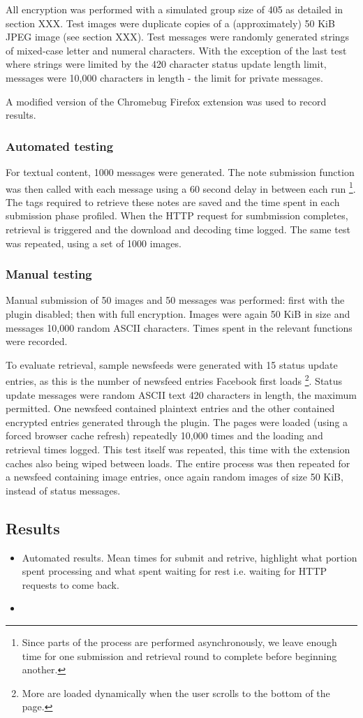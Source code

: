 All encryption was performed with a simulated group size of 405 as detailed in section XXX. Test images were duplicate copies of a (approximately) 50 KiB JPEG image (see section XXX). Test messages were randomly generated strings of mixed-case letter and numeral characters. With the exception of the last test where strings were limited by the 420 character status update length limit, messages were 10,000 characters in length - the limit for private messages. 

A modified version of the Chromebug Firefox extension was used to record results.

\subsubsection{Automated testing}

For textual content, 1000 messages were generated. The note submission function was then called with each message using a 60 second delay in between each run \footnote{Since parts of the process are performed asynchronously, we leave enough time for one submission and retrieval round to complete before beginning another.}. The tags required to retrieve these notes are saved and the time spent in each submission phase profiled. When the HTTP request for sumbmission completes, retrieval is triggered and the download and decoding time logged. The same test was repeated, using a set of 1000 images.

\subsubsection{Manual testing}

Manual submission of 50 images and 50 messages was performed: first with the plugin disabled; then with full encryption. Images were again 50 KiB in size and messages 10,000 random ASCII characters. Times spent in the relevant functions were recorded.

To evaluate retrieval, sample newsfeeds were generated with 15 status update entries, as this is the number of newsfeed entries Facebook first loads \footnote{More are loaded dynamically when the user scrolls to the bottom of the page.}. Status update messages were random ASCII text 420 characters in length, the maximum permitted. One newsfeed contained plaintext entries and the other contained encrypted entries generated through the plugin. The pages were loaded (using a forced browser cache refresh) repeatedly 10,000 times and the loading and retrieval times logged. This test itself was repeated, this time with the extension caches also being wiped between loads. The entire process was then repeated for a newsfeed containing image entries, once again random images of size 50 KiB, instead of status messages.

\subsection{Results}

\begin{itemize}
    \item Automated results. Mean times for submit and retrive, highlight what portion spent processing and what spent waiting for rest i.e. waiting for HTTP requests to come back.
    \item 
\end{itemize}